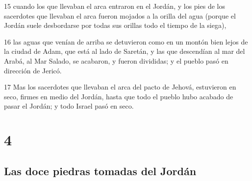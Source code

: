 \par 15 cuando los que llevaban el arca entraron en el Jordán, y los pies de los sacerdotes que llevaban el arca fueron mojados a la orilla del agua (porque el Jordán suele desbordarse por todas sus orillas todo el tiempo de la siega),
\par 16 las aguas que venían de arriba se detuvieron como en un montón bien lejos de la ciudad de Adam, que está al lado de Saretán, y las que descendían al mar del Arabá, al Mar Salado, se acabaron, y fueron divididas; y el pueblo pasó en dirección de Jericó.
\par 17 Mas los sacerdotes que llevaban el arca del pacto de Jehová, estuvieron en seco, firmes en medio del Jordán, hasta que todo el pueblo hubo acabado de pasar el Jordán; y todo Israel pasó en seco.

\chapter{4}

\section*{Las doce piedras tomadas del Jordán}

